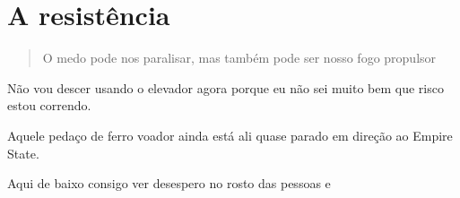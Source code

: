 \newpage
\color{white}
\pagecolor{black}

\chapter{A resistência}
\begin{quotation}
    O medo pode nos paralisar, mas também pode ser nosso fogo propulsor 
\end{quotation}

\newpage
\color{black}
\pagecolor{white}

Não vou descer usando o elevador agora porque eu não sei muito bem que risco estou correndo.

Aquele pedaço de ferro voador ainda está ali quase parado em direção ao Empire State.

Aqui de baixo consigo ver desespero no rosto das pessoas e 
